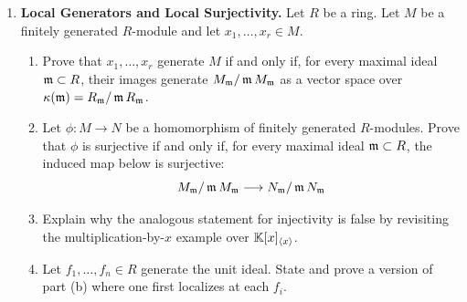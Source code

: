 \documentclass[Notebook.tex]{subfiles}
\begin{document}
\begin{enumerate}[leftmargin=*, resume=problems]
\item \textbf{Local Generators and Local Surjectivity.} Let $R$ be a ring. Let $M$ be a finitely generated $R$-module and let $x_1,\ldots,x_r\in M$.
\begin{enumerate}
    \item Prove that $x_1,\ldots,x_r$ generate $M$ if and only if, for every maximal ideal $\operatorname{\mathfrak{m}}\subset R$, their images generate $M_{\operatorname{\mathfrak{m}}}/\operatorname{\mathfrak{m}} M_{\operatorname{\mathfrak{m}}}$ as a vector space over $\kappa(\operatorname{\mathfrak{m}})=R_{\operatorname{\mathfrak{m}}}/\operatorname{\mathfrak{m}} R_{\operatorname{\mathfrak{m}}}$.
    \item Let $\phi:M\to N$ be a homomorphism of finitely generated $R$-modules. Prove that $\phi$ is surjective if and only if, for every maximal ideal $\operatorname{\mathfrak{m}}\subset R$, the induced map below is surjective:
    \[
    M_{\operatorname{\mathfrak{m}}}/\operatorname{\mathfrak{m}} M_{\operatorname{\mathfrak{m}}}\longrightarrow N_{\operatorname{\mathfrak{m}}}/\operatorname{\mathfrak{m}} N_{\operatorname{\mathfrak{m}}}
    \]
    \item Explain why the analogous statement for injectivity is false by revisiting the multiplication-by-$x$ example over $\mathbb K[x]_{\langle x\rangle}$.
    \item Let $f_1,\ldots,f_n\in R$ generate the unit ideal. State and prove a version of part (b) where one first localizes at each $f_i$.
\end{enumerate}

\end{enumerate}
\end{document}
